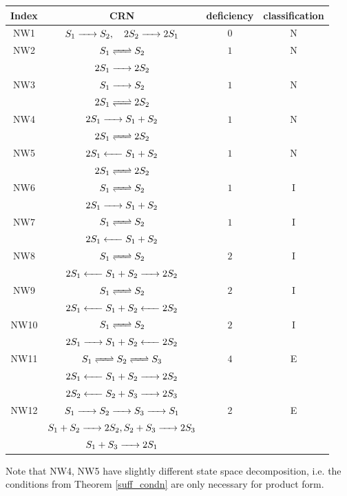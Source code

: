 \documentclass{amsart}
\theoremstyle{definition}
\theoremstyle{remark}
\theoremstyle{Conjecture/open problem}
\theoremstyle{assumption}
\theoremstyle{conjecture}
\numberwithin{equation}{section}
\begin{document}
\begin{center}
\begin{tabular}{ |c|c|c|c| }
 \hline
Index  & CRN & deficiency &classification \\

 \hline
 NW1  & $S_1\ce{->} S_2,\quad 2S_2\ce{->} 2S_1 $ &$0$& N  \\
            \hline 
NW2  & $S_1\ce{<=>} S_2$ &$1$& N  \\
&$2S_1\ce{->} 2S_2$&&\\
            \hline
 NW3  & $S_1\ce{->} S_2$ &$1$& N  \\
 &$2S_1\ce{<=>} 2S_2$&&\\
            \hline
 NW4  & $2S_1\ce{->} S_1+S_2$ &$1$& N  \\
 &$2S_1\ce{<=>} 2S_2$&&\\
            \hline 
             NW5  & $2S_1\ce{<-} S_1+S_2$ &$1$& N  \\
 &$2S_1\ce{<=>} 2S_2$&&\\
            \hline 
NW6  & $S_1\ce{<=>} S_2$ &$1$& I  \\
&$2S_1\ce{->} S_1+S_2$&&\\
            \hline

NW7  & $S_1\ce{<=>} S_2$ &$1$& I  \\
&$2S_1\ce{<-} S_1+S_2$&&\\
            \hline
  NW8  & $S_1\ce{<=>} S_2$ &$2$& I  \\
&$2S_1\ce{<-} S_1+S_2\ce{->}2S_2$&&\\
  \hline

NW9  & $S_1\ce{<=>} S_2$ &$2$& I  \\
&$2S_1\ce{<-} S_1+S_2\ce{<-}2S_2$&&\\
            \hline
NW10  & $S_1\ce{<=>} S_2$ &$2$& I  \\
&$2S_1\ce{->} S_1+S_2\ce{<-}2S_2$&&\\
            \hline
NW11  & $
 S_1 \ce{<=>}S_2 \ce{<=>} S_3$
  &$4$& E  \\
  &$2S_1 \ce{<-} S_1+S_2\ce{->}2S_2$&&\\
   &$2S_2 \ce{<-} S_2+S_3\ce{->}2S_3$&&\\
            \hline
   
NW12  & $
 S_1 \ce{->}S_2 \ce{->} S_3 \ce{->}S_1$
  &2& E  \\
  &$S_1+S_2 \ce{->} 2S_2,S_2+S_3\ce{->}2S_3$&&\\
   &$S_1+S_3 \ce{->} 2S_1$&&\\
            \hline
\end{tabular}
\end{center}
 Note that NW4, NW5 have slightly different state space decomposition, i.e. the conditions from Theorem \ref{suff_condn} are only necessary for product form.
 
\end{document}
